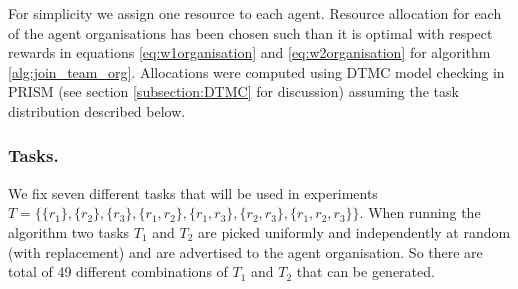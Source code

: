 \documentclass{llncs}
\begin{document}
For simplicity we assign one resource to each agent. Resource allocation for each of the agent organisations has been chosen such than it is optimal with respect rewards in equations \ref{eq:w1organisation} and \ref{eq:w2organisation} for algorithm \ref{alg:join_team_org}. Allocations were computed using DTMC model checking in PRISM (see section \ref{subsection:DTMC} for discussion) assuming the task distribution described below.

\subsubsection{Tasks.} We fix seven different tasks that will be used in experiments $T=\{\{r_1\},\{r_2\},\{r_3\},\{r_1,r_2\},\{r_1,r_3\},\{r_2,r_3\},\{r_1,r_2,r_3\}\}$. When running the algorithm two tasks $T_1$ and $T_2$ are picked uniformly and independently at random (with replacement) and are advertised to the agent organisation. So there are total of 49 different combinations of $T_1$ and $T_2$ that can be generated.
\end{document}
